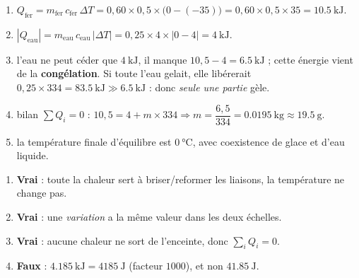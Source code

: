 \documentclass[11pt,a4paper]{article}
\begin{document}
\begin{corrige}
\begin{enumerate}[label=\alph*)]
  \item $Q_{\text{fer}} = m_{\text{fer}}\,c_{\text{fer}}\,\Delta T = 0{,}60\times 0{,}5\times\big(0-(-35)\big) = 0{,}60\times 0{,}5\times 35 = \qty{10.5}{\kilo\joule}$.
  \item $|Q_{\text{eau}}| = m_{\text{eau}}\,c_{\text{eau}}\,|\Delta T| = 0{,}25\times 4\times|0-4| = \qty{4}{\kilo\joule}$.
  \item l'eau ne peut céder que $\qty{4}{\kilo\joule}$, il manque $10{,}5-4 = \qty{6.5}{\kilo\joule}$ ; cette énergie vient de la \textbf{congélation}. Si toute l'eau gelait, elle libérerait $0{,}25\times 334 = \qty{83.5}{\kilo\joule}\gg\qty{6.5}{\kilo\joule}$ : donc \emph{seule une partie} gèle.
  \item bilan $\sum Q_i = 0$ : $10{,}5 = 4 + m\times 334 \Rightarrow m = \dfrac{6{,}5}{334} = \qty{0.0195}{\kilogram}\approx\qty{19.5}{\gram}$.
  \item la température finale d'équilibre est $\qty{0}{\celsius}$, avec coexistence de glace et d'eau liquide.
\end{enumerate}
\end{corrige}

\begin{corrige}
\begin{enumerate}[label=\alph*)]
  \item \textbf{Vrai} : toute la chaleur sert à briser/reformer les liaisons, la température ne change pas.
  \item \textbf{Vrai} : une \emph{variation} a la même valeur dans les deux échelles.
  \item \textbf{Vrai} : aucune chaleur ne sort de l'enceinte, donc $\sum_i Q_i = 0$.
  \item \textbf{Faux} : $\qty{4.185}{\kilo\joule} = \qty{4185}{\joule}$ (facteur $1000$), et non $\qty{41.85}{\joule}$.
\end{enumerate}
\end{corrige}
\end{document}
